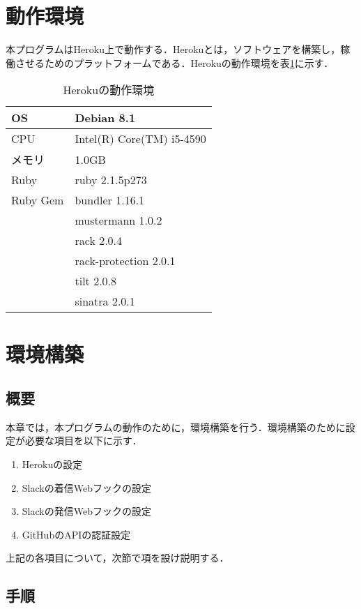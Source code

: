 \documentclass[12pt]{jsarticle}
\begin{document}
\section{動作環境}
本プログラムはHeroku上で動作する．Herokuとは，ソフトウェアを構築し，稼働させるためのプラットフォームである．Herokuの動作環境を表\ref{table1}に示す．
\begin{table}[h!]
  \begin{center}
    \caption{Herokuの動作環境}%
    \begin{tabular}{l|l}
      \hline\hline
      OS & Debian 8.1\\
      \hline
      CPU & Intel(R) Core(TM) i5-4590\\
      \hline
      メモリ & 1.0GB\\
      \hline
      Ruby & ruby 2.1.5p273\\
      \hline
      Ruby Gem & bundler 1.16.1\\
      & mustermann 1.0.2\\
      & rack 2.0.4\\
      & rack-protection 2.0.1\\
      & tilt 2.0.8\\
      & sinatra 2.0.1\\
      \hline
    \end{tabular}
    \label{table1}
  \end{center}
\end{table}
\section{環境構築}
\subsection{概要}
本章では，本プログラムの動作のために，環境構築を行う．環境構築のために設定が必要な項目を以下に示す．
\begin{enumerate}
\item Herokuの設定
\item Slackの着信Webフックの設定
\item Slackの発信Webフックの設定
\item GitHubのAPIの認証設定
\end{enumerate}
上記の各項目について，次節で項を設け説明する．
\subsection{手順}
\end{document}
